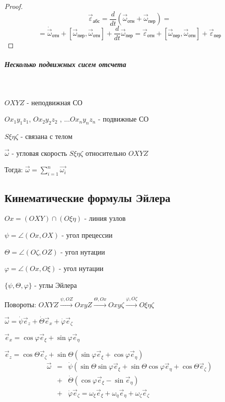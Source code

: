   \begin{proof}
  $$ \vec{\varepsilon}_{\text{абс}} = \frac{d}{dt}(\vec{\omega}_{\text{отн}} + \vec{\omega}_{\text{пер}}) = $$ 
  $$ = \dot{\vec{\omega}}_{\text{отн}} + [\vec{\omega}_{\text{пер}}, \vec{\omega}_{\text{отн}}] + \frac{d}{dt}\vec{\omega}_{\text{пер}} =
  \vec{\varepsilon}_{\text{отн}} + [\vec{\omega}_{\text{пер}}, \vec{\omega}_{\text{отн}}] + \vec{\varepsilon}_{\text{пер}} $$ 

  \end{proof}

  \subparagraph{Несколько подвижных сисем отсчета}~
  
  $OXYZ$ - неподвижная СО
  
  $Ox_1y_1z_1$, $Ox_2y_2z_2$ , $\ldots Ox_ny_nz_n$ - подвижные СО
  
  $S\xi\eta\zeta$ - связана с телом
  
  $\vec{\omega}$ - угловая скорость $S\xi\eta\zeta$ относительно $OXYZ$

  Тогда: $\vec{\omega} = \sum\limits_{i = 1}^{n} \vec{\omega_i}$
  
  \subsection{Кинематические формулы Эйлера} 
  \begin{df} $ Ox = (OXY)\cap(O\xi\eta) $ - линия узлов \end{df}
  \begin{df} $\psi = \angle(Ox, OX)$ - угол прецессии \end{df}
  \begin{df} $\Theta = \angle (O\zeta, OZ)$ - угол нутации \end{df}
  \begin{df} $\varphi = \angle (Ox, O\xi)$ - угол нутации \end{df}
  \begin{df} $\{\psi, \Theta, \varphi\}$ - углы Эйлера \end{df}

  Повороты:
  $ OXYZ \xrightarrow{\psi, OZ} OxyZ \xrightarrow{\Theta, Ox} Oxy\zeta \xrightarrow{\varphi, O\zeta} O\xi\eta\zeta $

  $\vec{\omega} = \dot{\psi}\vec{e}_z + \dot{\Theta}\vec{e}_x + \dot{\varphi}\vec{e}_{\zeta}$

  $\vec{e}_x = \cos \varphi \vec{e}_{\xi} + \sin \varphi \vec{e}_{\eta}$
  
  $\vec{e}_z = \cos \Theta \vec{e}_{\zeta} + \sin \Theta ( \sin \varphi \vec{e}_{\xi} + \cos \varphi \vec{e}_{\eta} )$
  $$\begin{array}{rcl}\vec{\omega} & = & \dot\psi(\sin \Theta \sin \varphi \vec{e}_{\xi} + \sin \Theta \cos \varphi \vec{e}_{\eta} + \cos \Theta \vec{e}_{\zeta}) \\
  & + & \dot \Theta (\cos \varphi \vec{e}_{\xi} - \sin \vec{e}_{\eta}) \\
  & + & \dot{\varphi}\vec{e}_{\zeta} = \omega_{\xi}\vec{e}_{\xi} + \omega_{\eta}\vec{e}_{\eta} + \omega_{\zeta}\vec{e}_{\zeta} \\
  \end{array}$$

